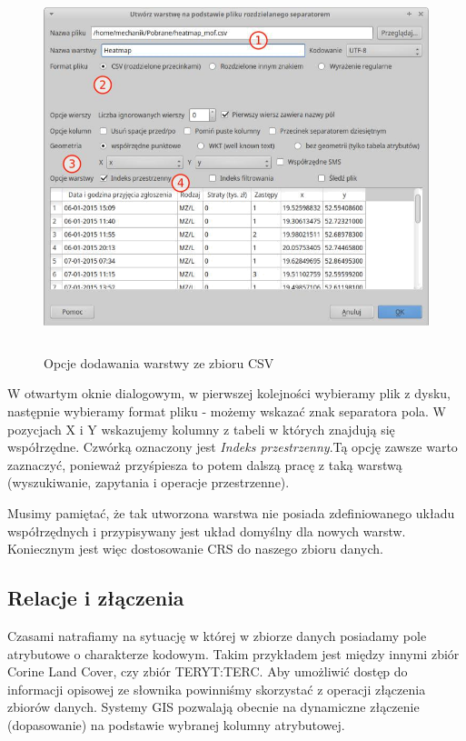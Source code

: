 \documentclass[12pt,a4paper]{book}
\begin{document}
\begin{center}
\begin{figure}
\includegraphics[width=13cm,height=10.696cm]{003-csv.png}
\caption{Opcje dodawania warstwy ze zbioru CSV}
\end{figure}
\end{center}
W otwartym oknie dialogowym, w pierwszej kolejności wybieramy plik z dysku, następnie wybieramy format pliku - możemy wskazać znak separatora pola. W pozycjach X i Y wskazujemy kolumny z tabeli w których znajdują się współrzędne. Czwórką oznaczony jest \textit{Indeks przestrzenny}.Tą opcję zawsze warto zaznaczyć, ponieważ przyśpiesza to potem dalszą pracę z taką warstwą (wyszukiwanie, zapytania i operacje przestrzenne).

Musimy pamiętać, że tak utworzona warstwa nie posiada zdefiniowanego układu współrzędnych i przypisywany jest układ domyślny dla nowych warstw. Koniecznym jest więc dostosowanie CRS do naszego zbioru danych.

\subsection{Relacje i złączenia}
Czasami natrafiamy na sytuację w której w zbiorze danych posiadamy pole atrybutowe o charakterze kodowym. Takim przykładem jest między innymi zbiór Corine Land Cover, czy zbiór TERYT:TERC. Aby umożliwić dostęp do informacji opisowej ze słownika powinniśmy skorzystać z operacji złączenia zbiorów danych. Systemy GIS pozwalają obecnie na dynamiczne złączenie (dopasowanie) na podstawie wybranej kolumny atrybutowej.
\end{document}
